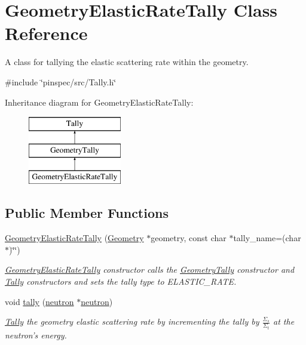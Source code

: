 \hypertarget{classGeometryElasticRateTally}{\section{Geometry\-Elastic\-Rate\-Tally Class Reference}
\label{classGeometryElasticRateTally}
}


A class for tallying the elastic scattering rate within the geometry.  




{\ttfamily \#include \char`\"{}pinspec/src/\-Tally.\-h\char`\"{}}

Inheritance diagram for Geometry\-Elastic\-Rate\-Tally\-:\begin{figure}[H]
\begin{center}
\leavevmode
\includegraphics[height=3.000000cm]{classGeometryElasticRateTally}
\end{center}
\end{figure}
\subsection*{Public Member Functions}
\begin{DoxyCompactItemize}
\item 
\hyperlink{classGeometryElasticRateTally_acae25bceffafeb18ab0552dcca9b11df}{Geometry\-Elastic\-Rate\-Tally} (\hyperlink{classGeometry}{Geometry} $\ast$geometry, const char $\ast$tally\-\_\-name=(char $\ast$)\char`\"{}\char`\"{})
\begin{DoxyCompactList}\small\item\em \hyperlink{classGeometryElasticRateTally}{Geometry\-Elastic\-Rate\-Tally} constructor calls the \hyperlink{classGeometryTally}{Geometry\-Tally} constructor and \hyperlink{classTally}{Tally} constructors and sets the tally type to E\-L\-A\-S\-T\-I\-C\-\_\-\-R\-A\-T\-E. \end{DoxyCompactList}\item 
void \hyperlink{classGeometryElasticRateTally_a7bf2a8bc3afbc47354bad45159237ec3}{tally} (\hyperlink{structneutron}{neutron} $\ast$\hyperlink{structneutron}{neutron})
\begin{DoxyCompactList}\small\item\em \hyperlink{classTally}{Tally} the geometry elastic scattering rate by incrementing the tally by $ \frac{\Sigma_s}{\Sigma_t} $ at the neutron's energy. \end{DoxyCompactList}\end{DoxyCompactItemize}
